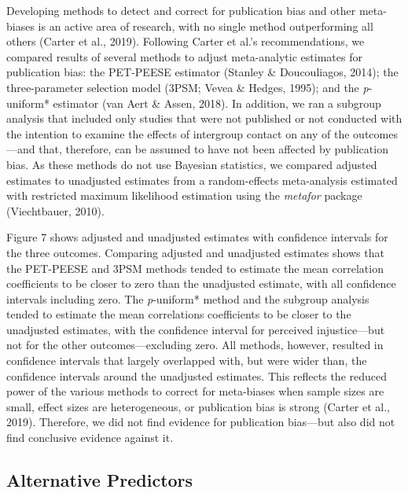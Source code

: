 \documentclass[12pt, letterpaper]{article}
\begin{document}
Developing methods to detect and correct for publication bias and other
meta-biases is an active area of research, with no single method
outperforming all others (Carter et al., 2019). Following Carter et
al.'s recommendations, we compared results of several methods to adjust
meta-analytic estimates for publication bias: the PET-PEESE estimator
(Stanley \& Doucouliagos, 2014); the three-parameter selection model
(3PSM; Vevea \& Hedges, 1995); and the \emph{p}-uniform* estimator (van
Aert \& Assen, 2018). In addition, we ran a subgroup analysis that
included only studies that were not published or not conducted with the
intention to examine the effects of intergroup contact on any of the
outcomes---and that, therefore, can be assumed to have not been affected
by publication bias. As these methods do not use Bayesian statistics, we
compared adjusted estimates to unadjusted estimates from a
random-effects meta-analysis estimated with restricted maximum
likelihood estimation using the \emph{metafor} package (Viechtbauer,
2010).

Figure 7 shows adjusted and unadjusted estimates with confidence
intervals for the three outcomes. Comparing adjusted and unadjusted
estimates shows that the PET-PEESE and 3PSM methods tended to estimate
the mean correlation coefficients to be closer to zero than the
unadjusted estimate, with all confidence intervals including zero. The
\emph{p}-uniform* method and the subgroup analysis tended to estimate
the mean correlations coefficients to be closer to the unadjusted
estimates, with the confidence interval for perceived injustice---but
not for the other outcomes---excluding zero. All methods, however,
resulted in confidence intervals that largely overlapped with, but were
wider than, the confidence intervals around the unadjusted estimates.
This reflects the reduced power of the various methods to correct for
meta-biases when sample sizes are small, effect sizes are heterogeneous,
or publication bias is strong (Carter et al., 2019). Therefore, we did
not find evidence for publication bias---but also did not find
conclusive evidence against it.

\hypertarget{alternative-predictors}{%
\subsection{Alternative Predictors}\label{alternative-predictors}}
\end{document}
